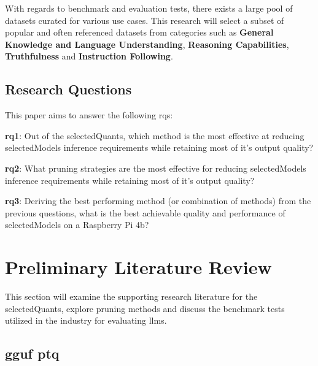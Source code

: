 \documentclass{ifacconf}
\begin{document}
	With regards to benchmark and evaluation tests, there exists a large pool of datasets curated for various use cases. This research will select a subset of popular and often referenced datasets from categories such as \textbf{General Knowledge and Language Understanding}, \textbf{Reasoning Capabilities}, \textbf{Truthfulness} and \textbf{Instruction Following}.
	
	\subsection{Research Questions}
	This paper aims to answer the following \glspl{rq}:
	
	\textbf{\gls{rq}1}: Out of the \gls{selectedQuants}, which method is the most effective at reducing \gls{selectedModels} inference requirements while retaining most of it's output quality?
	
	\textbf{\gls{rq}2}: What pruning strategies are the most effective for reducing \gls{selectedModels} inference requirements while retaining most of it's output quality?
	
	\textbf{\gls{rq}3}: Deriving the best performing method (or combination of methods) from the previous questions, what is the best achievable quality and performance of \gls{selectedModels} on a Raspberry Pi 4b?
	
	
	\section{Preliminary Literature Review}
	This section will examine the supporting research literature for the \gls{selectedQuants}, explore pruning methods and discuss the benchmark tests utilized in the industry for evaluating \glspl{llm}.
	
	\subsection{\gls{gguf} \gls{ptq}}
	
\end{document}
